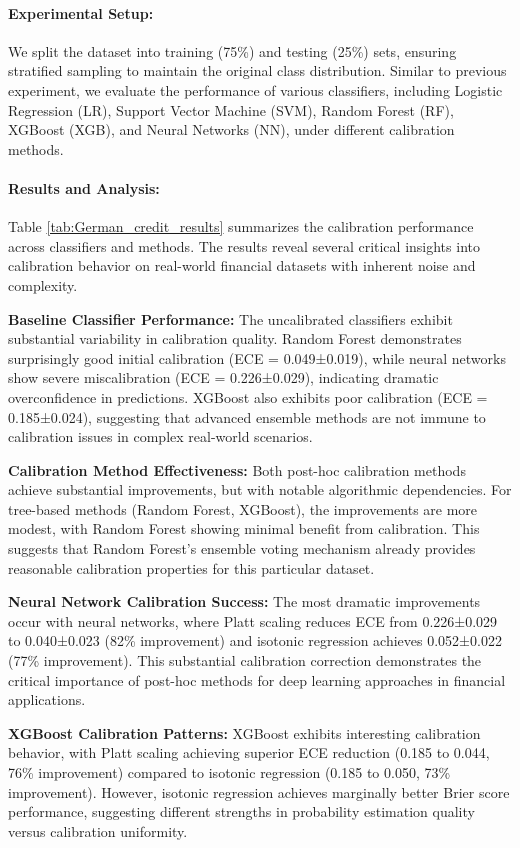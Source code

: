 \documentclass[12pt, a4paper]{article}
\begin{document}
\paragraph{Experimental Setup:} We split the dataset into training (75\%) and testing (25\%) sets, ensuring stratified sampling to maintain the original class distribution. Similar to previous experiment, we evaluate the performance of various classifiers, including Logistic Regression (LR), Support Vector Machine (SVM), Random Forest (RF), XGBoost (XGB), and Neural Networks (NN), under different calibration methods.

\paragraph{Results and Analysis:} Table \ref{tab:German_credit_results} summarizes the calibration performance across classifiers and methods. The results reveal several critical insights into calibration behavior on real-world financial datasets with inherent noise and complexity.

\textbf{Baseline Classifier Performance:} The uncalibrated classifiers exhibit substantial variability in calibration quality. Random Forest demonstrates surprisingly good initial calibration (ECE = 0.049±0.019), while neural networks show severe miscalibration (ECE = 0.226±0.029), indicating dramatic overconfidence in predictions. XGBoost also exhibits poor calibration (ECE = 0.185±0.024), suggesting that advanced ensemble methods are not immune to calibration issues in complex real-world scenarios.

\textbf{Calibration Method Effectiveness:} Both post-hoc calibration methods achieve substantial improvements, but with notable algorithmic dependencies. For tree-based methods (Random Forest, XGBoost), the improvements are more modest, with Random Forest showing minimal benefit from calibration. This suggests that Random Forest's ensemble voting mechanism already provides reasonable calibration properties for this particular dataset.

\textbf{Neural Network Calibration Success:} The most dramatic improvements occur with neural networks, where Platt scaling reduces ECE from 0.226±0.029 to 0.040±0.023 (82\% improvement) and isotonic regression achieves 0.052±0.022 (77\% improvement). This substantial calibration correction demonstrates the critical importance of post-hoc methods for deep learning approaches in financial applications.

\textbf{XGBoost Calibration Patterns:} XGBoost exhibits interesting calibration behavior, with Platt scaling achieving superior ECE reduction (0.185 to 0.044, 76\% improvement) compared to isotonic regression (0.185 to 0.050, 73\% improvement). However, isotonic regression achieves marginally better Brier score performance, suggesting different strengths in probability estimation quality versus calibration uniformity.
\end{document}
